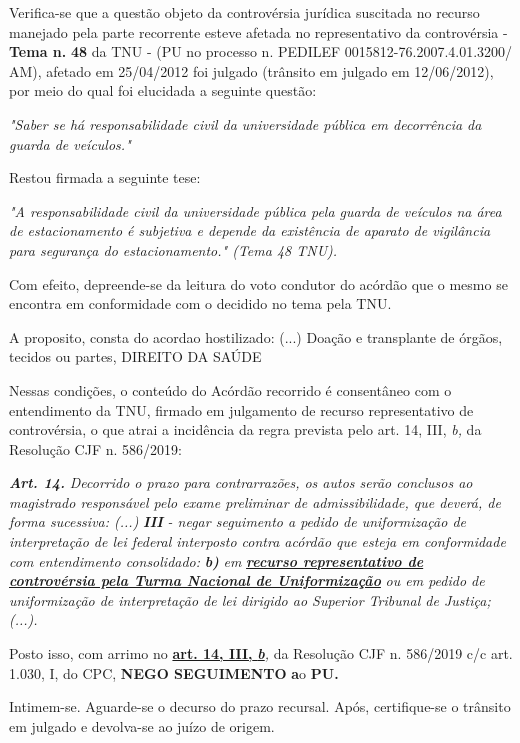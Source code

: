 \documentclass[12pt]{article}
\begin{document}
\justifying
\noindent Verifica-se que a questão objeto da controvérsia jurídica suscitada no recurso manejado pela parte recorrente esteve afetada no representativo da controvérsia - \textbf{Tema n. }\textbf{48} da TNU - (PU no processo n. PEDILEF 0015812-76.2007.4.01.3200/ AM),  afetado em 25/04/2012 foi julgado (trânsito em julgado em 12/06/2012), por meio do qual foi elucidada a seguinte questão:

\noindent \textit{"Saber se há responsabilidade civil da universidade pública em decorrência da guarda de veículos."}

\noindent Restou firmada a seguinte tese:

\noindent \textit{"A responsabilidade civil da universidade pública pela guarda de veículos na área de estacionamento é subjetiva e depende da existência de aparato de vigilância para segurança do estacionamento." (Tema 48 TNU).}

\noindent Com efeito, depreende-se da leitura do voto condutor do acórdão que o mesmo se encontra em conformidade com o decidido no  tema pela TNU.

\noindent A proposito, consta do acordao hostilizado: (...) Doação e transplante de órgãos, tecidos ou partes, DIREITO DA SAÚDE

\noindent Nessas condições, o conteúdo do Acórdão recorrido é consentâneo com o entendimento da TNU, firmado em julgamento de recurso representativo de controvérsia, o que atrai a incidência da regra prevista pelo art. 14, III, \textit{b,} da Resolução CJF n. 586/2019:

\noindent \textit{\textbf{Art. 14.}}\textit{ Decorrido o prazo para contrarrazões, os autos serão conclusos ao magistrado responsável pelo exame preliminar de admissibilidade, que deverá, de forma sucessiva: (...) }\textit{\textbf{III }}\textit{- negar seguimento a pedido de uniformização de interpretação de lei federal interposto contra acórdão que esteja em conformidade com entendimento consolidado: }\textit{\textbf{b)}}\textit{ em }\uline{\textit{\textbf{recurso representativo de controvérsia pela Turma Nacional de Uniformização}}}\textit{ ou em pedido de uniformização de interpretação de lei dirigido ao Superior Tribunal de Justiça;(...).}

\noindent Posto isso, com arrimo no \uline{\textbf{art. 14, III, }}\uline{\textit{\textbf{b}}}\textit{,} da Resolução CJF n. 586/2019 c/c art. 1.030, I, do CPC, \textbf{NEGO SEGUIMENTO }\textbf{a}o\textbf{ PU}\textbf{.}

\noindent Intimem-se. Aguarde-se o decurso do prazo recursal. Após, certifique-se o trânsito em julgado e devolva-se ao juízo de origem.
\end{document}
